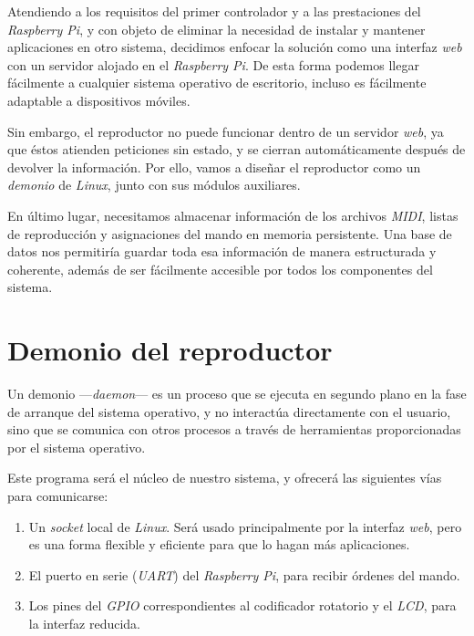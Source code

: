 Atendiendo a los requisitos del primer controlador y a las prestaciones del \textit{Raspberry Pi}, y con objeto de eliminar la necesidad de instalar y mantener aplicaciones en otro sistema, decidimos enfocar la solución como una interfaz \textit{web} con un servidor alojado en el \textit{Raspberry Pi}. De esta forma podemos llegar fácilmente a cualquier sistema operativo de escritorio, incluso es fácilmente adaptable a dispositivos móviles.

Sin embargo, el reproductor no puede funcionar dentro de un servidor \textit{web}, ya que éstos atienden peticiones sin estado, y se cierran automáticamente después de devolver la información. Por ello, vamos a diseñar el reproductor como un \textit{demonio} de \textit{Linux}, junto con sus módulos auxiliares.

En último lugar, necesitamos almacenar información de los archivos \textit{MIDI}, listas de reproducción y asignaciones del mando en memoria persistente. Una base de datos nos permitiría guardar toda esa información de manera estructurada y coherente, además de ser fácilmente accesible por todos los componentes del sistema.

\section{Demonio del reproductor}

Un demonio ---\textit{daemon}--- es un proceso que se ejecuta en segundo plano en la fase de arranque del sistema operativo, y no interactúa directamente con el usuario, sino que se comunica con otros procesos a través de herramientas proporcionadas por el sistema operativo.

Este programa será el núcleo de nuestro sistema, y ofrecerá las siguientes vías para comunicarse:

\begin{enumerate}
	\item Un \textit{socket} local de \textit{Linux}. Será usado principalmente por la interfaz \textit{web}, pero es una forma flexible y eficiente para que lo hagan más aplicaciones.
	
	\item El puerto en serie (\textit{UART}) del \textit{Raspberry Pi}, para recibir órdenes del mando.
	
	\item Los pines del \textit{GPIO} correspondientes al codificador rotatorio y el \textit{LCD}, para la interfaz reducida.
\end{enumerate}


